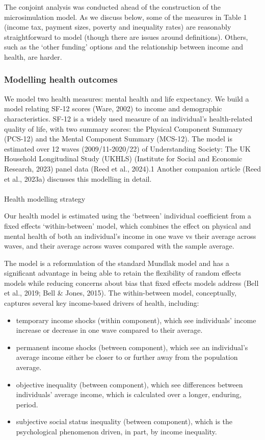 \documentclass[
  letterpaper,
  DIV=11,
  numbers=noendperiod]{scrartcl}
\makeatletter
\let\oldparagraph\paragraph
\renewcommand{\paragraph}{
    \@ifstar
      \xxxParagraphStar
      \xxxParagraphNoStar
  }
\newcommand{\xxxParagraphStar}[1]{\oldparagraph*{#1}\mbox{}}
\newcommand{\xxxParagraphNoStar}[1]{\oldparagraph{#1}\mbox{}}
\providecommand{\tightlist}{%
  \setlength{\itemsep}{0pt}\setlength{\parskip}{0pt}}\usepackage{longtable,booktabs,array}
\makeatother
\begin{document}
The conjoint analysis was conducted ahead of the construction of the
microsimulation model. As we discuss below, some of the measures in
Table 1 (income tax, payment sizes, poverty and inequality rates) are
reasonably straightforward to model (though there are issues around
definitions). Others, such as the `other funding' options and the
relationship between income and health, are harder.

\subsubsection{Modelling health
outcomes}\label{modelling-health-outcomes}

We model two health measures: mental health and life expectancy. We
build a model relating SF-12 scores (Ware, 2002) to income and
demographic characteristics. SF-12 is a widely used measure of an
individual's health-related quality of life, with two summary scores:
the Physical Component Summary (PCS-12) and the Mental Component Summary
(MCS-12). The model is estimated over 12 waves (2009/11-2020/22) of
Understanding Society: The UK Household Longitudinal Study (UKHLS)
(Institute for Social and Economic Research, 2023) panel data (Reed et
al., 2024).1 Another companion article (Reed et al., 2023a) discusses
this modelling in detail.

\paragraph{Health modelling strategy}\label{health-modelling-strategy}

Our health model is estimated using the `between' individual coefficient
from a fixed effects `within-between' model, which combines the effect
on physical and mental health of both an individual's income in one wave
vs their average across waves, and their average across waves compared
with the sample average.

The model is a reformulation of the standard Mundlak model and has a
significant advantage in being able to retain the flexibility of random
effects models while reducing concerns about bias that fixed effects
models address (Bell et al., 2019; Bell \& Jones, 2015). The
within-between model, conceptually, captures several key income-based
drivers of health, including:

\begin{itemize}
\tightlist
\item
  temporary income shocks (within component), which see individuals'
  income increase or decrease in one wave compared to their average.
\item
  permanent income shocks (between component), which see an individual's
  average income either be closer to or further away from the population
  average.
\item
  objective inequality (between component), which see differences
  between individuals' average income, which is calculated over a
  longer, enduring, period.
\item
  subjective social status inequality (between component), which is the
  psychological phenomenon driven, in part, by income inequality.
\end{itemize}
\end{document}
